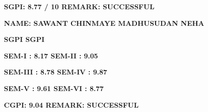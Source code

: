 \documentclass{article} %
\begin{document}
\textbf{}

\noindent \textbf{SGPI: 8.77 / 10                                                                                    REMARK: SUCCESSFUL\underbar{}}

\textbf{\underbar{}}

\noindent \textbf{}

\noindent \textbf{}

\noindent \textbf{}

\textbf{}

\noindent 

\noindent \textbf{NAME: SAWANT CHINMAYE MADHUSUDAN NEHA}

\noindent \textbf{}

\noindent \textbf{}

\noindent \textbf{}

\noindent \textbf{}

\noindent \textbf{}

\textbf{                        SGPI                                                                             SGPI     }

\textbf{               SEM-I        :   8.17                                                         SEM-II     :  9.05}

\textbf{                  SEM-III     :   8.78                              SEM-IV    :  9.87}

\textbf{                 SEM-V       :   9.61                                     SEM-VI    :  8.77}

\noindent \textbf{         }

\noindent \textbf{}

\noindent \textbf{}

\textbf{          CGPI:   9.04                                                    REMARK: SUCCESSFUL}

\textbf{\underbar{}}

\textbf{\underbar{}}

\textbf{\underbar{}}

\textbf{\underbar{}}

\textbf{\underbar{}}

\textbf{\underbar{}}

\textbf{\underbar{}}

\textbf{\underbar{}}

\textbf{\underbar{}}

\textbf{\underbar{}}

\textbf{\underbar{}}
\end{document}
